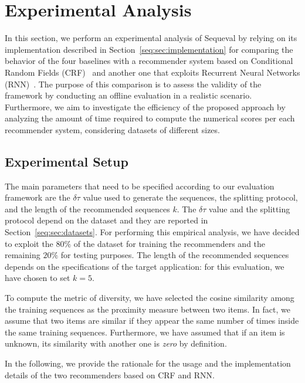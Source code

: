 \section{Experimental Analysis}
\label{seq:sec:analysis}

In this section, we perform an experimental analysis of Sequeval by relying on its implementation described in Section~\ref{seq:sec:implementation} for comparing the behavior of the four baselines with a recommender system based on Conditional Random Fields (CRF)~\cite{Sutton2011} and another one that exploits Recurrent Neural Networks (RNN)~\cite{Goodfellow2016}. The purpose of this comparison is to assess the validity of the framework by conducting an offline evaluation in a realistic scenario. Furthermore, we aim to investigate the efficiency of the proposed approach by analyzing the amount of time required to compute the numerical scores per each recommender system, considering datasets of different sizes.

\subsection{Experimental Setup}
\label{seq:sec:setup}

The main parameters that need to be specified according to our evaluation framework are the $\delta \tau$ value used to generate the sequences, the splitting protocol, and the length of the recommended sequences $k$. The $\delta \tau$ value and the splitting protocol depend on the dataset and they are reported in Section~\ref{seq:sec:datasets}. For performing this empirical analysis, we have decided to exploit the $80\%$ of the dataset for training the recommenders and the remaining $20\%$ for testing purposes. The length of the recommended sequences depends on the specifications of the target application: for this evaluation, we have chosen to set $k = 5$.

To compute the metric of diversity, we have selected the cosine similarity among the training sequences as the proximity measure between two items. In fact, we assume that two items are similar if they appear the same number of times inside the same training sequences. Furthermore, we have assumed that if an item is unknown, its similarity with another one is \textit{zero} by definition.

In the following, we provide the rationale for the usage and the implementation details of the two recommenders based on CRF and RNN.

